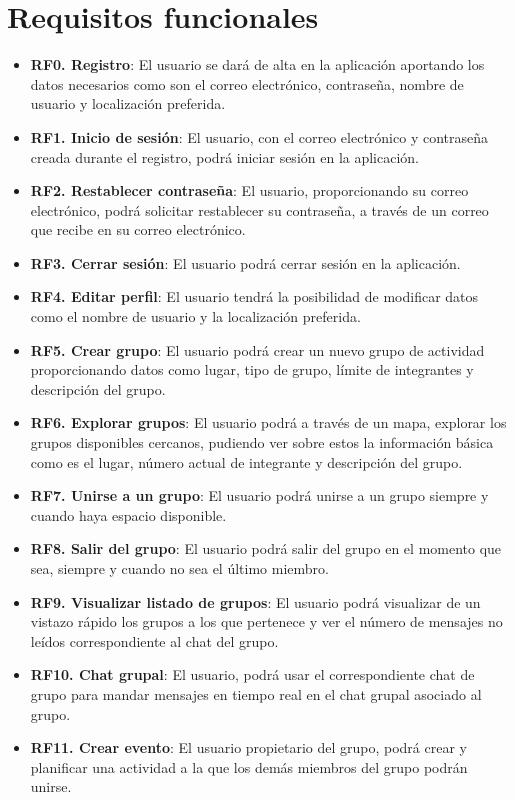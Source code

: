 \section{Requisitos funcionales}
        \begin{itemize}
            \item \textbf{RF0. Registro}: El usuario se dará de alta en la aplicación aportando los datos necesarios como son el correo electrónico, contraseña, nombre de usuario y localización preferida.
            \item \textbf{RF1. Inicio de sesión}: El usuario, con el correo electrónico y contraseña creada durante el registro, podrá iniciar sesión en la aplicación.
            \item \textbf{RF2. Restablecer contraseña}: El usuario, proporcionando su correo electrónico, podrá solicitar restablecer su contraseña, a través de un correo que recibe en su correo electrónico.
            \item \textbf{RF3. Cerrar sesión}: El usuario podrá cerrar sesión en la aplicación.
            \item \textbf{RF4. Editar perfil}: El usuario tendrá la posibilidad de modificar datos como el nombre de usuario y la localización preferida.
            \item \textbf{RF5. Crear grupo}: El usuario podrá crear un nuevo grupo de actividad proporcionando datos como lugar, tipo de grupo, límite de integrantes y descripción del grupo.
            \item \textbf{RF6. Explorar grupos}: El usuario podrá a través de un mapa, explorar los grupos disponibles cercanos, pudiendo ver sobre estos la información básica como es el lugar, número actual de integrante y descripción del grupo.
            \item \textbf{RF7. Unirse a un grupo}: El usuario podrá unirse a un grupo siempre y cuando haya espacio disponible.
            \item \textbf{RF8. Salir del grupo}: El usuario podrá salir del grupo en el momento que sea, siempre y cuando no sea el último miembro.
            \item \textbf{RF9. Visualizar listado de grupos}: El usuario podrá visualizar de un vistazo rápido los grupos a los que pertenece y ver el número de mensajes no leídos correspondiente al chat del grupo.
            \item \textbf{RF10. Chat grupal}: El usuario, podrá usar el correspondiente chat de grupo para mandar mensajes en tiempo real en el chat grupal asociado al grupo.
            \item \textbf{RF11. Crear evento}: El usuario propietario del grupo, podrá crear y planificar una actividad a la que los demás miembros del grupo podrán unirse.
        \end{itemize}

